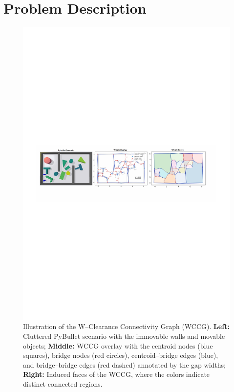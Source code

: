 \section{Problem Description}\label{sec:problem}
\begin{figure}[t!]
  \centering
  \includegraphics[width=0.95\linewidth]{figures/wccg.pdf}
  \vspace{-0.1in}
  \caption{Illustration of the W--Clearance Connectivity Graph (WCCG).
\textbf{Left:} Cluttered PyBullet scenario with the immovable walls and movable objects;
\textbf{Middle:} WCCG overlay with the centroid nodes (blue squares), bridge nodes
(red circles), centroid--bridge edges (blue), and bridge--bridge edges (red dashed)
annotated by the gap widths;
\textbf{Right:} Induced faces of the WCCG, where the colors indicate distinct connected
regions.}
  \label{fig:wccg}
  \vspace{-0.2in}
\end{figure}
